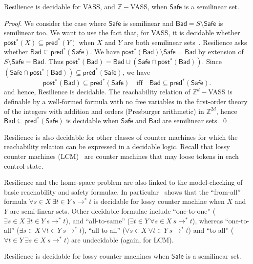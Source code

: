 \documentclass[runningheads]{llncs}
\newcommand{\pred}{\textsf{pred}}
\newcommand{\post}{\textsf{post}}
\newcommand{\Bad}{\textsf{Bad}}
\newcommand{\Safe}{\textsf{Safe}}
\begin{document}
\begin{theorem}\label{SL VASS}
{\sc Resilience} is decidable for VASS, and $\mathbb{Z}-$VASS, when $\Safe$  is a semilinear set.
\end{theorem}

\begin{proof}
We consider the case where $\Safe$ is semilinear
and $\Bad = S \setminus \Safe$ is semilinear too.
We want to use the fact that, for VASS,
it is decidable whether $\post^*(X) \subseteq \pred^*(Y)$ when 
$X$ and $Y$ are both semilinear sets~\cite{DBLP:journals/corr/abs-2207-02697}.
{\sc Resilience} asks whether $\Bad \subseteq \pred^*(\Safe)$.
We have $\post^*(\Bad) \setminus \Safe = \Bad$ by extension of $S \setminus \Safe = \Bad$.
Thus $\post^*(\Bad) = \Bad \cup (\Safe \cap \post^*(\Bad))$. Since $(\Safe \cap \post^*(\Bad)) \subseteq \pred^*(\Safe)$, we have
\[\post^*(\Bad) \subseteq \pred^*(\Safe) \quad \text{iff} \quad \Bad \subseteq \pred^*(\Safe).\]
and hence, {\sc Resilience} is decidable. 
The reachability relation of 
 $\mathbb{Z}^d-$VASS is definable by a well-formed formula with no free variables in the first-order theory of the integers with addition and orders (Presburger arithmetic) in $\mathbb{Z}^{2d}$, hence	$\Bad \subseteq \pred^*(\Safe)$ is decidable when $\Safe$ and $\Bad$ are semilinear sets. \qed
\end{proof}

{\sc Resilience} is also decidable for other classes of counter machines for which the reachability relation can be expressed in a decidable logic. Recall that lossy counter machines (LCM)~\cite{DBLP:conf/rp/Schnoebelen10} are counter machines that may loose tokens in each control-state.

Resilience and the home-space problem are also linked to the 
model-checking of basic reachability and safety formulae. 
In particular~\cite{DBLP:conf/rp/Schnoebelen10} shows that the ``from-all'' formula $\forall s \in X~ \exists t \in Y~ s \to^* t$
is decidable for lossy counter machine
when $X$ and $Y$ are semi-linear sets.
Other decidable formulae include ``one-to-one'' ($\exists s \in  X ~ \exists t \in  Y ~ s \to^* 
 t$), and ``all-to-same'' ($\exists t \in  Y ~ \forall s \in  X ~ s \to^*  t$),
whereas ``one-to-all'' ($\exists s \in  X ~ \forall t \in  Y ~ s \to^*  t$), 
``all-to-all'' ($\forall s \in  X ~ \forall t \in  Y ~ s \to^*  t$)
  and ``to-all'' ($\forall t \in  Y  ~ \exists s \in  X ~ s \to^*  t$) are undecidable (again, for LCM). 

\begin{theorem}\label{SL Lossy}
{\sc Resilience} is decidable for lossy counter machines when $\Safe$  is a semilinear set.
\end{theorem}
\end{document}
